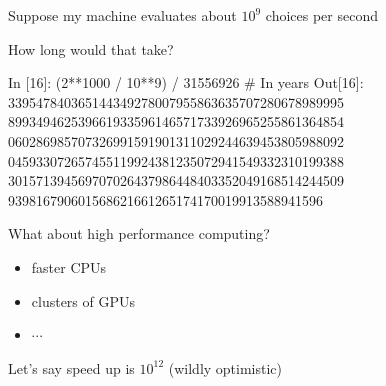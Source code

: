 \documentclass[
    xcolor={svgnames,dvipsnames},
    hyperref={colorlinks, citecolor=DeepPink4, linkcolor=DarkRed, urlcolor=DarkBlue}
    ]{beamer}  %
\newcommand{\1}{\mathbbm 1}
\begin{document}
\begin{frame}[fragile]

    Suppose my machine evaluates about $10^9$ choices per second

        \vspace{0.5em}
        \vspace{0.5em}
        \vspace{0.5em}
    How long would that take?

\end{frame}


\begin{frame}[fragile]


\begin{pythoncode}
In [16]: (2**1000 / 10**9) / 31556926  # In years
Out[16]:
339547840365144349278007955863635707280678989995
899349462539661933596146571733926965255861364854
060286985707326991591901311029244639453805988092
045933072657455119924381235072941549332310199388
301571394569707026437986448403352049168514244509
939816790601568621661265174170019913588941596
\end{pythoncode}

\end{frame}



\begin{frame}[fragile]

    What about high performance computing?
    
    \begin{itemize}
        \item faster CPUs
        \vspace{0.5em}
        \item clusters of GPUs
        \vspace{0.5em}
        \item $\cdots$
    \end{itemize}

        \vspace{0.5em}
        \vspace{0.5em}
        \vspace{0.5em}
    Let's say speed up is $10^{12}$ (wildly optimistic)



\end{frame}
\end{document}
